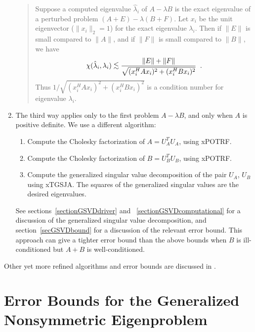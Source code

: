 \begin{enumerate}
\begin{quote}
Suppose a computed eigenvalue $\hat{\lambda}_i$ of $A- \lambda B$ is
the exact eigenvalue of a perturbed problem $(A+E) - \lambda (B+F)$.
Let $x_i$ be the unit eigenvector ($\|x_i\|_2=1$) for the exact
eigenvalue $\lambda_i$.
Then if $\|E\|$ is small compared to
$\|A\|$, and if $\|F\|$ is small compared to $\|B\|$, we have
\[
\chi ( \hat{\lambda}_i , \lambda_i ) \leapproxeq
\frac{\|E\| + \|F\|}{\sqrt{(x_i^H Ax_i )^2 + (x_i^H Bx_i )^2}} \; \; .
\]
Thus $1/{\sqrt{(x_i^H Ax_i )^2 + (x_i^H Bx_i )^2}}$ is a condition number for
eigenvalue $\lambda_i$.
\end{quote}

\item The third way applies only to the first problem $A - \lambda B$, and only
when $A$ is positive definite. We use a different algorithm:

\begin{enumerate}

\item Compute the Cholesky factorization of $A = U^T_A U_A$, using xPOTRF.

\item Compute the Cholesky factorization of $B = U^T_B U_B$, using xPOTRF.

\item Compute the generalized singular value decomposition of the pair
$U_A$, $U_B$ using xTGSJA. The squares of the generalized singular
values are the desired eigenvalues.

\end{enumerate}

See sections~\ref{sectionGSVDdriver} and ~\ref{sectionGSVDcomputational}
for a discussion of the generalized singular
value decomposition, and section~\ref{secGSVDbound} for a discussion of
the relevant error bound. This approach can give a tighter error bound
than the above bounds when $B$ is ill-conditioned but $A+B$ is
well-conditioned.

\end{enumerate}

Other yet more refined algorithms and error bounds are discussed in
\cite{barlowdemmel,stewartsun90,wilkinson1}.

\section{Error Bounds for the Generalized Nonsymmetric Eigenproblem}
\label{sec_GNEPErrorBounds}

